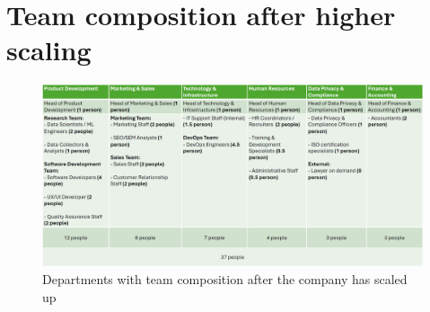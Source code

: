 \section{Team composition after higher scaling}
\begin{figure}[H]
    \centering
    \includegraphics[width=\textwidth]{figures/team_comp_highscaled.png}
    \caption{Departments with team composition after the company has scaled up}
    \label{fig:team_comp_highscaled}
\end{figure}